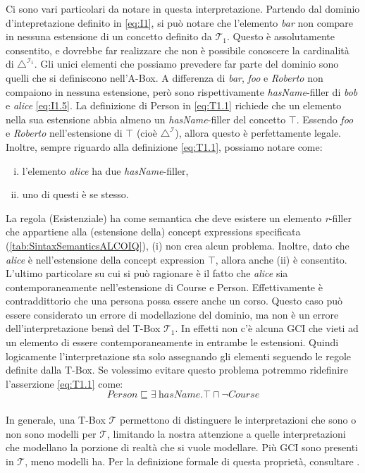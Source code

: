 Ci sono vari particolari da notare in questa interpretazione. Partendo dal dominio d'intepretazione definito in \eqref{eq:I1}, si può notare che l'elemento \textit{bar} non compare in nessuna estensione di un concetto definito da $\mathcal{T}_1$. Questo è assolutamente consentito, e dovrebbe far realizzare che non è possibile conoscere la cardinalità di $\triangle^{\mathcal{I}_1}$. Gli unici elementi che possiamo prevedere far parte del dominio sono quelli che si definiscono nell'A-Box. A differenza di \textit{bar}, \textit{foo} e \textit{Roberto} non compaiono in nessuna estensione, però sono rispettivamente \textit{hasName}-filler di \textit{bob} e \textit{alice} \eqref{eq:I1.5}. La definizione di Person in \eqref{eq:T1.1} richiede che un elemento nella sua estensione abbia almeno un \textit{hasName}-filler del concetto $\top$. Essendo \textit{foo} e \textit{Roberto} nell'estensione di $\top$ (cioè $\triangle^\mathcal{I}$), allora questo è perfettamente legale. Inoltre, sempre riguardo alla definizione \eqref{eq:T1.1}, possiamo notare come:
\begin{enumerate}[(i)]
	\item l'elemento \textit{alice} ha due \textit{hasName}-filler,
	\item uno di questi è se stesso.
\end{enumerate}
La regola (Esistenziale) ha come semantica che deve esistere un elemento \textit{r}-filler che appartiene alla (estensione della) concept expressions specificata (\autoref{tab:SintaxSemanticsALCOIQ}), (i) non crea alcun problema. Inoltre, dato che \textit{alice} è nell'estensione della concept expression $\top$, allora anche (ii) è consentito.\\
L'ultimo particolare su cui si può ragionare è il fatto che \textit{alice} sia contemporaneamente nell'estensione di Course e Person. Effettivamente è contraddittorio che una persona possa essere anche un corso. Questo caso può essere considerato un errore di modellazione del dominio, ma non è un errore dell'interpretazione bensì del T-Box $\mathcal{T}_1$. In effetti non c'è alcuna GCI che vieti ad un elemento di essere contemporaneamente in entrambe le estensioni. Quindi logicamente l'interpretazione sta solo assegnando gli elementi seguendo le regole definite dalla T-Box. Se volessimo evitare questo problema potremmo ridefinire l'asserzione \eqref{eq:T1.1} come:
\[ Person \sqsubseteq \exists\ \textit{hasName}.\top \sqcap \neg Course \]
\\
In generale, una T-Box $\mathcal{T}$ permettono di distinguere le interpretazioni che sono o non sono modelli per $\mathcal{T}$, limitando la nostra attenzione a quelle interpretazioni che modellano la porzione di realtà che si vuole modellare. Più GCI sono presenti in $\mathcal{T}$, meno modelli ha. Per la definizione formale di questa proprietà, consultare \cite{baader2017introductionDL}.
